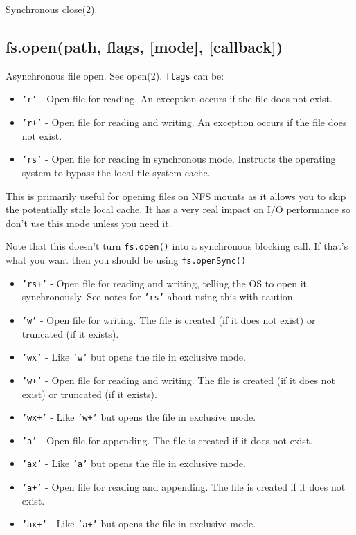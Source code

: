 Synchronous close(2).

\subsection{fs.open(path, flags, {[}mode{]}, {[}callback{]})}

Asynchronous file open. See open(2). \texttt{flags} can be:

\begin{itemize}
\item
  \texttt{'r'} - Open file for reading. An exception occurs if the file
  does not exist.
\item
  \texttt{'r+'} - Open file for reading and writing. An exception occurs
  if the file does not exist.
\item
  \texttt{'rs'} - Open file for reading in synchronous mode. Instructs
  the operating system to bypass the local file system cache.
\end{itemize}

This is primarily useful for opening files on NFS mounts as it allows
you to skip the potentially stale local cache. It has a very real impact
on I/O performance so don't use this mode unless you need it.

Note that this doesn't turn \texttt{fs.open()} into a synchronous
blocking call. If that's what you want then you should be using
\texttt{fs.openSync()}

\begin{itemize}
\item
  \texttt{'rs+'} - Open file for reading and writing, telling the OS to
  open it synchronously. See notes for \texttt{'rs'} about using this
  with caution.
\item
  \texttt{'w'} - Open file for writing. The file is created (if it does
  not exist) or truncated (if it exists).
\item
  \texttt{'wx'} - Like \texttt{'w'} but opens the file in exclusive
  mode.
\item
  \texttt{'w+'} - Open file for reading and writing. The file is created
  (if it does not exist) or truncated (if it exists).
\item
  \texttt{'wx+'} - Like \texttt{'w+'} but opens the file in exclusive
  mode.
\item
  \texttt{'a'} - Open file for appending. The file is created if it does
  not exist.
\item
  \texttt{'ax'} - Like \texttt{'a'} but opens the file in exclusive
  mode.
\item
  \texttt{'a+'} - Open file for reading and appending. The file is
  created if it does not exist.
\item
  \texttt{'ax+'} - Like \texttt{'a+'} but opens the file in exclusive
  mode.
\end{itemize}

